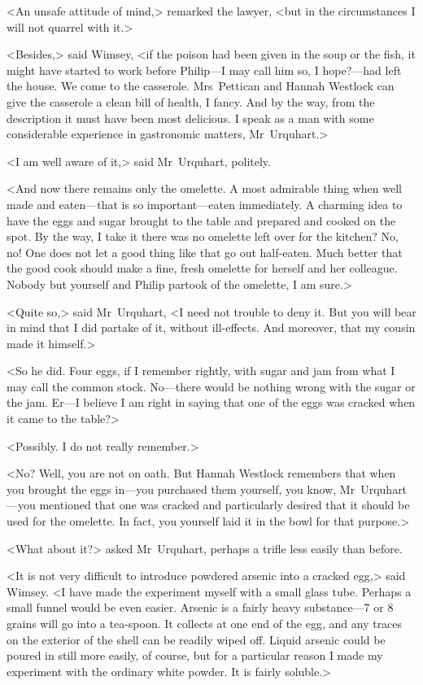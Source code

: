 <An unsafe attitude of mind,> remarked the lawyer, <but in the circumstances I will not quarrel with it.>

<Besides,> said Wimsey, <if the poison had been given in the soup or the fish, it might have started to work before Philip—I may call him so, I hope?—had left the house. We come to the casserole. Mrs~Pettican and Hannah Westlock can give the casserole a clean bill of health, I fancy. And by the way, from the description it must have been most delicious. I speak as a man with some considerable experience in gastronomic matters, Mr~Urquhart.>

<I am well aware of it,> said Mr~Urquhart, politely.

<And now there remains only the omelette. A most admirable thing when well made and eaten—that is so important—eaten immediately. A charming idea to have the eggs and sugar brought to the table and prepared and cooked on the spot. By the way, I take it there was no omelette left over for the kitchen? No, no! One does not let a good thing like that go out half-eaten. Much better that the good cook should make a fine, fresh omelette for herself and her colleague. Nobody but yourself and Philip partook of the omelette, I am sure.>

<Quite so,> said Mr~Urquhart, <I need not trouble to deny it. But you will bear in mind that I did partake of it, without ill-effects. And moreover, that my cousin made it himself.>

<So he did. Four eggs, if I remember rightly, with sugar and jam from what I may call the common stock. No—there would be nothing wrong with the sugar or the jam. Er—I believe I am right in saying that one of the eggs was cracked when it came to the table?>

<Possibly. I do not really remember.>

<No? Well, you are not on oath. But Hannah Westlock remembers that when you brought the eggs in—you purchased them yourself, you know, Mr~Urquhart—you mentioned that one was cracked and particularly desired that it should be used for the omelette. In fact, you yourself laid it in the bowl for that purpose.>

<What about it?> asked Mr~Urquhart, perhaps a trifle less easily than before.

<It is not very difficult to introduce powdered arsenic into a cracked egg,> said Wimsey. <I have made the experiment myself with a small glass tube. Perhaps a small funnel would be even easier. Arsenic is a fairly heavy substance—7 or 8 grains will go into a tea-spoon. It collects at one end of the egg, and any traces on the exterior of the shell can be readily wiped off. Liquid arsenic could be poured in still more easily, of course, but for a particular reason I made my experiment with the ordinary white powder. It is fairly soluble.>

